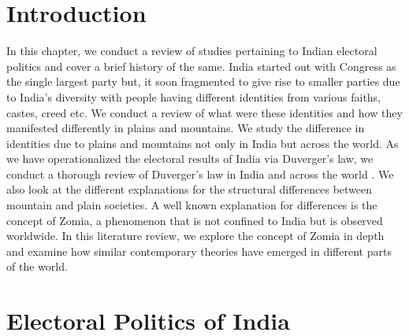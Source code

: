 \begin{sloppypar}
\section{Introduction}
In this chapter, we conduct a review of studies pertaining to Indian electoral politics and cover a brief history of the same. India started out with Congress as the single largest party \citep{kothari1967india} but, it soon fragmented to give rise to smaller parties due to India's diversity with people having different identities from various faiths, castes, creed etc. We conduct a review of what were these identities and how they manifested differently in plains and mountains. We study the difference in identities due to plains and mountains not only in India but across the world.  As we have operationalized the electoral results of India via Duverger's law, we conduct a thorough review of Duverger's law in India and across the world \citep{duverger1954political}. We also look at the different explanations for the structural differences between mountain and plain societies. A well known explanation for differences is the concept of Zomia, a phenomenon that is not confined to India but is observed worldwide. In this literature review, we explore the concept of Zomia in depth and examine how similar contemporary theories have emerged in different parts of the world. 

\section{Electoral Politics of India}

\end{sloppypar}
